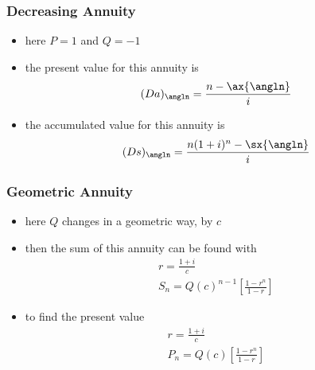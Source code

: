 \documentclass[../00_main.tex]{subfiles}
\begin{document}
\subsubsection{Decreasing Annuity}
\begin{itemize}
    \item here $P=1$ and $Q=-1$
    \item the present value for this annuity is 
    \begin{equation}\nonumber
        (Da)_{\angln} = \frac{n - \ax{\angln}}{i}
    \end{equation}
    \item the accumulated value for this annuity is 
    \begin{equation}\nonumber
        (Ds)_{\angln} = \frac{n(1+i)^n - \sx{\angln}}{i}
    \end{equation}
\end{itemize}

\subsubsection{Geometric Annuity}
\begin{itemize}
    \item here $Q$ changes in a geometric way, by $c$
    \item then the sum of this annuity can be found with
    \begin{equation}\nonumber
        \begin{gathered}
        r = \frac{1+i}{c}\\
        S_n = Q(c)^{n-1} \left[\frac{1-r^n}{1-r} \right]
        \end{gathered}
    \end{equation}
    \item to find the present value 
    \begin{equation}\nonumber
        \begin{gathered}
        r = \frac{1+i}{c}\\
        P_n = Q(c) \left[\frac{1-r^n}{1-r} \right]
        \end{gathered}
    \end{equation}
\end{itemize}
\end{document}
